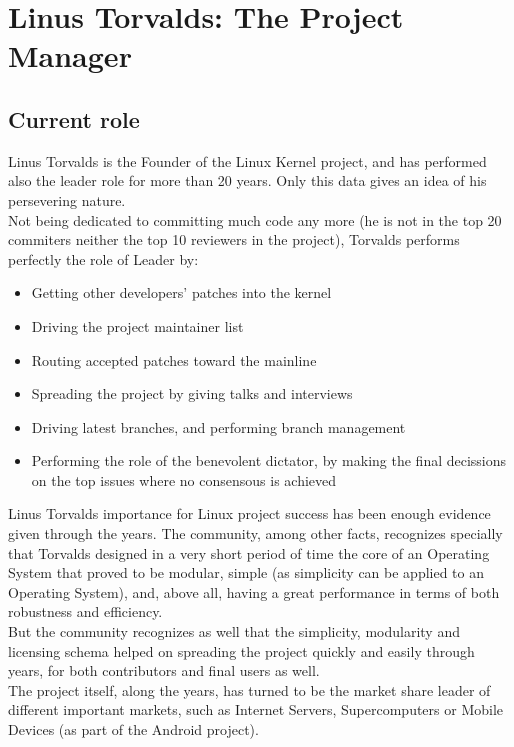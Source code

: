 \documentclass[11pt]{article}
\begin{document}
\section{Linus Torvalds: The Project Manager}
\subsection{Current role}
Linus Torvalds is the Founder of the Linux Kernel project, and has performed also the leader role for more than 20 years. Only this data gives an idea of his persevering nature.\\
Not being dedicated to committing much code any more (he is not in the top 20 commiters neither the top 10 reviewers in the project), Torvalds performs perfectly the role of Leader by:
\begin{itemize}\itemsep0pt
\item{Getting other developers’ patches into the kernel}
\item{Driving the project maintainer list}
\item{Routing accepted patches toward the mainline}
\item{Spreading the project by giving talks and interviews}
\item{Driving latest branches, and performing branch management}
\item{Performing the role of the benevolent dictator, by making the final decissions on the top issues where no consensous is achieved}
\end{itemize}
Linus Torvalds importance for Linux project success has been enough evidence given through the years. The community, among other facts, recognizes specially that Torvalds designed in a very short period of time the core of an Operating System that proved to be modular, simple (as simplicity can be applied to an Operating System), and, above all, having a great performance in terms of both robustness and efficiency.\\
But the community recognizes as well that the simplicity, modularity and licensing schema helped on spreading the project quickly and easily through years, for both contributors and final users as well.\\
The project itself, along the years, has turned to be the market share leader of different important markets, such as Internet Servers, Supercomputers or Mobile Devices (as part of the Android project).
\end{document}
